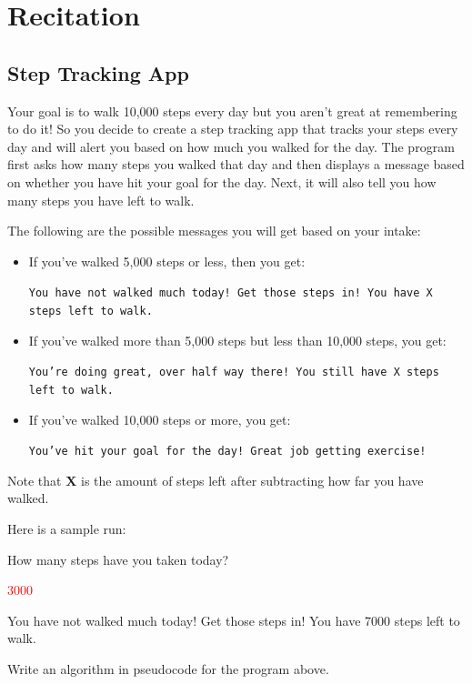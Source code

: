 \section{Recitation}
\subsection{Step Tracking App}
Your goal is to walk 10,000 steps every day but you aren’t great at remembering to do it! So you decide to create a step tracking app that tracks your steps every day and will alert you based on how much you walked for the day. The program first asks how many steps you walked that day and then displays a message based on whether you have hit your goal for the day. Next, it will also tell you how many steps you have left to walk.

The following are the possible messages you will get based on your intake:

\begin{itemize}
    \item If you've walked 5,000 steps or less, then you get: 
    
    \texttt{You have not walked much today! Get those steps in! You have X steps left to walk.}
    
    \item If you’ve walked more than 5,000 steps but less than 10,000 steps, you get: 
    
    \texttt{You're doing great, over half way there! You still have X steps left to walk.}

    \item If you've walked 10,000 steps or more, you get:
    
    \texttt{You've hit your goal for the day! Great job getting exercise!}
\end{itemize}

Note that \textbf{X} is the amount of steps left after subtracting how far you have walked. 

Here is a sample run:

\begin{sample}
How many steps have you taken today?

\textcolor{red}{3000}

You have not walked much today! Get those steps in! You have 7000 steps left to walk.
\end{sample}

\begin{multipart}
    Write an algorithm in pseudocode for the program above.
\end{multipart}

